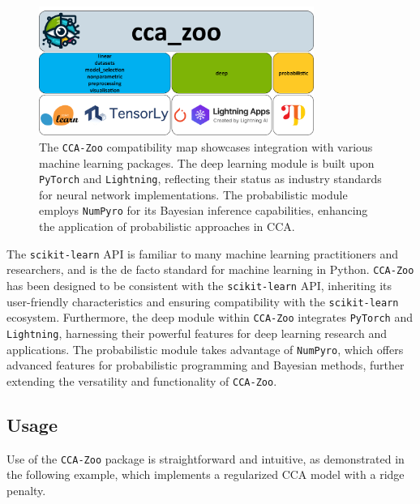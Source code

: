 \begin{figure}[ht]
    \centering
    \includegraphics[width=0.8\textwidth]{figures/CCA_Zoo_map}
    \caption[The \texttt{CCA-Zoo} compatibility map]{The \texttt{CCA-Zoo} compatibility map showcases integration with various machine learning packages. The deep learning module is built upon \texttt{PyTorch} and \texttt{Lightning}, reflecting their status as industry standards for neural network implementations. The probabilistic module employs \texttt{NumPyro} for its Bayesian inference capabilities, enhancing the application of probabilistic approaches in CCA.}
    \label{fig:cca-zoo-api}
\end{figure}

The \texttt{scikit-learn} API is familiar to many machine learning practitioners and researchers, and is the de facto standard for machine learning in Python. \texttt{CCA-Zoo} has been designed to be consistent with the \texttt{scikit-learn} API, inheriting its user-friendly characteristics and ensuring compatibility with the \texttt{scikit-learn} ecosystem. Furthermore, the deep module within \texttt{CCA-Zoo} integrates \texttt{PyTorch} and \texttt{Lightning}, harnessing their powerful features for deep learning research and applications. The probabilistic module takes advantage of \texttt{NumPyro}, which offers advanced features for probabilistic programming and Bayesian methods, further extending the versatility and functionality of \texttt{CCA-Zoo}.


\subsection{Usage}

Use of the \texttt{CCA-Zoo} package is straightforward and intuitive, as demonstrated in the following example, which implements a regularized CCA model with a ridge penalty.

